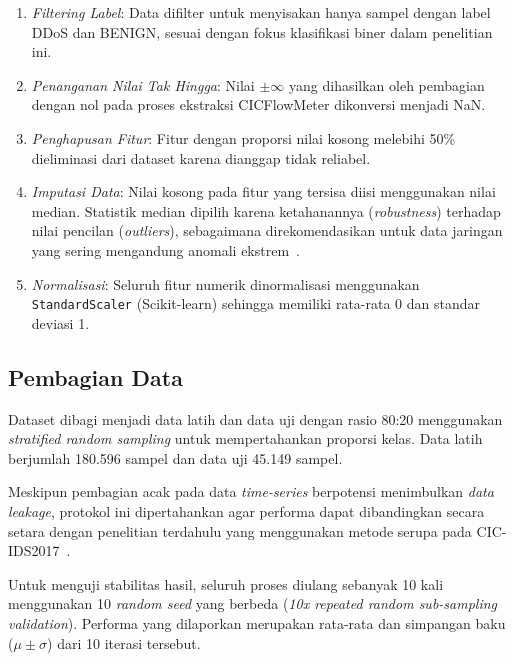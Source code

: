 \documentclass[conference,a4paper]{IEEEtran}
\begin{document}
\begin{enumerate}
    \item \textit{Filtering Label}: Data difilter untuk menyisakan hanya sampel dengan label DDoS dan BENIGN, sesuai dengan fokus klasifikasi biner dalam penelitian ini.

    \item \textit{Penanganan Nilai Tak Hingga}: Nilai $\pm\infty$ yang dihasilkan oleh pembagian dengan nol pada proses ekstraksi CICFlowMeter dikonversi menjadi NaN.

    \item \textit{Penghapusan Fitur}: Fitur dengan proporsi nilai kosong melebihi 50\% dieliminasi dari dataset karena dianggap tidak reliabel.

    \item \textit{Imputasi Data}: Nilai kosong pada fitur yang tersisa diisi menggunakan nilai median. Statistik median dipilih karena ketahanannya (\textit{robustness}) terhadap nilai pencilan (\textit{outliers}), sebagaimana direkomendasikan untuk data jaringan yang sering mengandung anomali ekstrem~\cite{ref_liu2020}.

    \item \textit{Normalisasi}: Seluruh fitur numerik dinormalisasi menggunakan \texttt{StandardScaler} (Scikit-learn) sehingga memiliki rata-rata 0 dan standar deviasi 1.
\end{enumerate}

\subsection{Pembagian Data}

Dataset dibagi menjadi data latih dan data uji dengan rasio 80:20 menggunakan \textit{stratified random sampling} untuk mempertahankan proporsi kelas. Data latih berjumlah 180.596 sampel dan data uji 45.149 sampel.

Meskipun pembagian acak pada data \textit{time-series} berpotensi menimbulkan \textit{data leakage}, protokol ini dipertahankan agar performa dapat dibandingkan secara setara dengan penelitian terdahulu yang menggunakan metode serupa pada CIC-IDS2017~\cite{ref_kasongo2020, ref_ullah2020, ref_thakkar2020}.

Untuk menguji stabilitas hasil, seluruh proses diulang sebanyak 10 kali menggunakan 10 \textit{random seed} yang berbeda (\textit{10x repeated random sub-sampling validation}). Performa yang dilaporkan merupakan rata-rata dan simpangan baku ($\mu \pm \sigma$) dari 10 iterasi tersebut.
\end{document}
